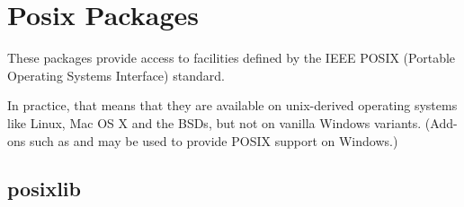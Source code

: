 \section{Posix Packages}

%
%

These packages provide access to facilities defined by the IEEE POSIX 
(Portable Operating Systems Interface) standard.

In practice, that means that they are available on unix-derived 
operating systems like Linux, Mac OS X and the BSDs, but not on 
vanilla Windows variants.  (Add-ons such as 
  
and 
  
may be used to provide POSIX support on Windows.)



\subsection{posixlib}		

